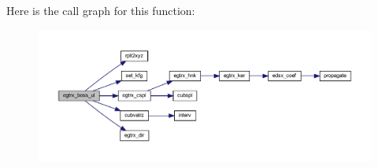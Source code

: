 Here is the call graph for this function\+:\nopagebreak
\begin{figure}[H]
\begin{center}
\leavevmode
\includegraphics[width=350pt]{Leroi__c_8f90_a1770320680e91059231180f0654cce66_cgraph}
\end{center}
\end{figure}
\mbox{\label{Leroi__c_8f90_a10fd9ada0ec15151a8112666c09a245d}} 
